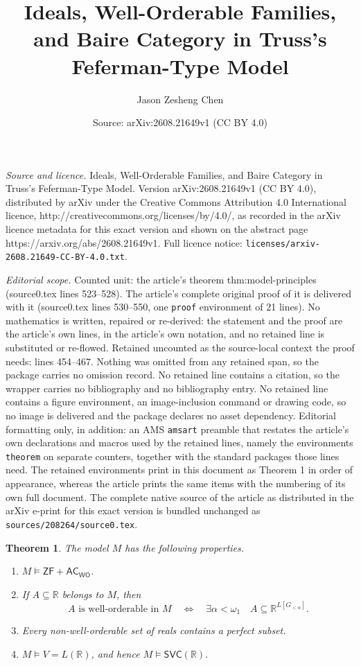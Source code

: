 \documentclass[10pt,a4paper]{amsart}
\title{Ideals, Well-Orderable Families, and Baire Category in Truss's Feferman-Type Model}
\author{Jason Zesheng Chen}
\date{Source: arXiv:2608.21649v1 (CC BY 4.0)}
\newtheorem{theorem}{Theorem}
\newcommand{\R}{\mathbb R}
\newcommand{\WO}{\mathsf{WO}}
\begin{document}
\maketitle

\noindent\emph{Source and licence.} Ideals, Well-Orderable Families, and Baire Category in Truss's Feferman-Type Model. Version arXiv:2608.21649v1 (CC BY 4.0), distributed by arXiv under the Creative Commons Attribution 4.0 International licence, http://creativecommons.org/licenses/by/4.0/, as recorded in the arXiv licence metadata for this exact version and shown on the abstract page https://arxiv.org/abs/2608.21649v1. Full licence notice: \texttt{licenses/arxiv-2608.21649-CC-BY-4.0.txt}.\par\smallskip

\noindent\textit{Editorial scope.} Counted unit: the article's theorem thm:model-principles (source0.tex lines 523--528). The article's complete original proof of it is delivered with it (source0.tex lines 530--550, one \texttt{proof} environment of 21 lines). No mathematics is written, repaired or re-derived: the statement and the proof are the article's own lines, in the article's own notation, and no retained line is substituted or re-flowed.  Retained uncounted as the source-local context the proof needs: lines 454--467.  Nothing was omitted from any retained span, so the package carries no omission record.  No retained line contains a citation, so the wrapper carries no bibliography and no bibliography entry.  No retained line contains a figure environment, an image-inclusion command or drawing code, so no image is delivered and the package declares no asset dependency.  Editorial formatting only, in addition: an AMS \texttt{amsart} preamble that restates the article's own declarations and macros used by the retained lines, namely the environments \texttt{theorem} on separate counters, together with the standard packages those lines need.  The retained environments print in this document as Theorem 1 in order of appearance, whereas the article prints the same items with the numbering of its own full document.  The complete native source of the article as distributed in the arXiv e-print for this exact version is bundled unchanged as \texttt{sources/208264/source0.tex}.
\begin{theorem}\label{thm:truss}
The model $M$ has the following properties.
\begin{enumerate}
\item $M\models\mathsf{ZF}+\mathsf{AC}_{\WO}$.
\item If $A\subseteq\R$ belongs to $M$, then
\[
A\text{ is well-orderable in }M
\quad\Longleftrightarrow\quad
\exists\alpha<\omega_1\quad A\subseteq\R^{L[G_{<\alpha}]}.
\]
\item Every non-well-orderable set of reals contains a perfect subset.
\item $M\models V=L(\R)$, and hence $M\models\mathsf{SVC}(\R)$.
\end{enumerate}
\end{theorem}
\end{document}
